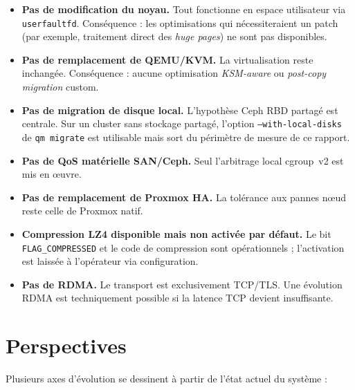 \begin{itemize}[leftmargin=*]
    \item \textbf{Pas de modification du noyau.} Tout fonctionne en espace utilisateur via \texttt{userfaultfd}. Conséquence : les optimisations qui nécessiteraient un patch (par exemple, traitement direct des \emph{huge pages}) ne sont pas disponibles.
    \item \textbf{Pas de remplacement de QEMU/KVM.} La virtualisation reste inchangée. Conséquence : aucune optimisation \emph{KSM-aware} ou \emph{post-copy migration} custom.
    \item \textbf{Pas de migration de disque local.} L'hypothèse Ceph RBD partagé est centrale. Sur un cluster sans stockage partagé, l'option \texttt{--with-local-disks} de \texttt{qm migrate} est utilisable mais sort du périmètre de mesure de ce rapport.
    \item \textbf{Pas de QoS matérielle SAN/Ceph.} Seul l'arbitrage local cgroup~v2 est mis en œuvre.
    \item \textbf{Pas de remplacement de Proxmox HA.} La tolérance aux pannes nœud reste celle de Proxmox natif.
    \item \textbf{Compression LZ4 disponible mais non activée par défaut.} Le bit \texttt{FLAG\_COMPRESSED} et le code de compression sont opérationnels ; l'activation est laissée à l'opérateur via configuration.
    \item \textbf{Pas de RDMA.} Le transport est exclusivement TCP/TLS. Une évolution RDMA est techniquement possible si la latence TCP devient insuffisante.
\end{itemize}

\section{Perspectives}
\label{sec:perspectives}

Plusieurs axes d'évolution se dessinent à partir de l'état actuel du système :

